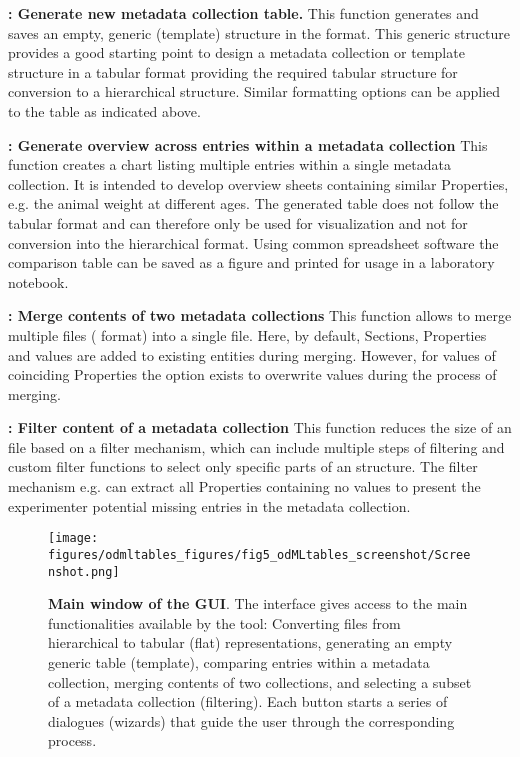 \textbf{\fgenerate: Generate new metadata collection table.} This function generates and saves an empty, generic (template)  structure in the  format. This generic structure provides a good starting point to design a metadata collection or template structure in a tabular format providing the required tabular structure for conversion to a hierarchical  structure. Similar formatting options can be applied to the table as indicated above.

\textbf{\fcompare: Generate overview across entries within a metadata collection} This function creates a chart listing multiple entries within a single metadata collection. It is intended to develop overview sheets containing similar Properties, e.g. the animal weight at different ages. The generated table does not follow the tabular  format and can therefore only be used for visualization and not for conversion into the hierarchical  format. Using common spreadsheet software the comparison table can be saved as a figure and printed for usage in a laboratory notebook.

\textbf{\fmerge: Merge contents of two metadata collections} This function allows to merge multiple files ( format) into a single file. Here, by default, Sections, Properties and values are added to existing entities during merging. However, for values of coinciding Properties the option exists to overwrite values during the process of merging.

\textbf{\ffilter: Filter content of a metadata collection} This function reduces the size of an  file based on a filter mechanism, which can include multiple steps of filtering and custom filter functions to select only specific parts of an  structure. The filter mechanism e.g. can extract all Properties containing no values to present the experimenter potential missing entries in the metadata collection.


\begin{figure}[!ht]
\begin{center}
\texttt{[image: figures/odmltables\_figures/fig5\_odMLtables\_screenshot/Screenshot.png]}
\caption[Main window of the  GUI]{{\label{fig:GUI_mainwindow}
\textbf{Main window of the  GUI}. The interface gives access to the main functionalities available by the tool: Converting files from hierarchical to tabular (flat) representations, generating an empty generic  table (template), comparing entries within a metadata collection, merging contents of two collections, and selecting a subset of a metadata collection (filtering). Each button starts a series of dialogues (wizards) that guide the user through the corresponding process.
}}
\end{center}
\end{figure}

